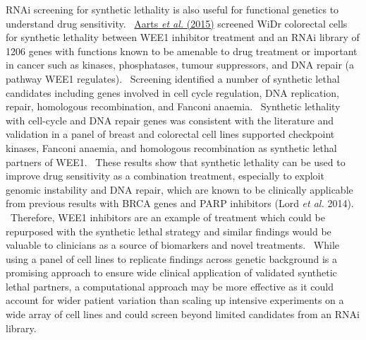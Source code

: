 RNAi screening for synthetic lethality is also useful for functional genetics to understand drug sensitivity. \ \hyperlink{ENREF1}{Aarts}\hyperlink{ENREF1}{\textit{ et al.}}\hyperlink{ENREF1}{ (2015)} screened WiDr colorectal cells for synthetic lethality between WEE1 inhibitor treatment and an RNAi library of 1206 genes with functions known to be amenable to drug treatment or important in cancer such as kinases, phosphatases, tumour suppressors, and DNA repair (a pathway WEE1 regulates). \ Screening identified a number of synthetic lethal candidates including genes involved in cell cycle regulation, DNA replication, repair, homologous recombination, and Fanconi anaemia. \ Synthetic lethality with cell-cycle and DNA repair genes was consistent with the literature and validation in a panel of breast and colorectal cell lines supported checkpoint kinases, Fanconi anaemia, and homologous recombination as synthetic lethal partners of WEE1. \ These results show that synthetic lethality can be used to improve drug sensitivity as a combination treatment, especially to exploit genomic instability and DNA repair, which are known to be clinically applicable from previous results with BRCA genes and PARP inhibitors (Lord\textit{ et al.} 2014). \ Therefore, WEE1 inhibitors are an example of treatment which could be repurposed with the synthetic lethal strategy and similar findings would be valuable to clinicians as a source of biomarkers and novel treatments. \ While using a panel of cell lines to replicate findings across genetic background is a promising approach to ensure wide clinical application of validated synthetic lethal partners, a computational approach may be more effective as it could account for wider patient variation than scaling up intensive experiments on a wide array of cell lines and could screen beyond limited candidates from an RNAi library. \  

